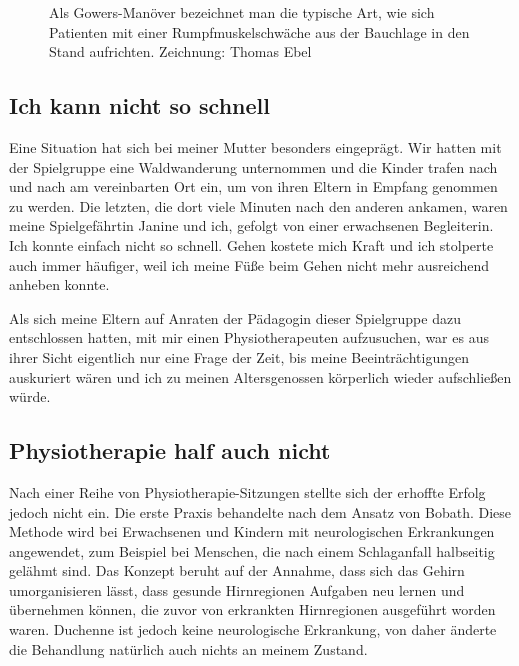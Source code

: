 \documentclass[fontsize=14pt,a4paper,headinclude,DIV=calc,automark]{scrbook}
\begin{document}
\setlength{\fboxsep}{0pt}    %
\setlength{\fboxrule}{0.2pt} %
\begin{figure}[ht]
    \centering
    \caption{Als Gowers-Manöver bezeichnet man die typische Art, wie sich Patienten mit einer Rumpfmuskelschwäche aus der Bauchlage in den Stand aufrichten. Zeichnung: Thomas Ebel}
    \label{fig:gowers-manöver}
\end{figure}

\subsection{Ich kann nicht so schnell}

Eine Situation hat sich bei meiner Mutter besonders eingeprägt. Wir hatten mit der Spielgruppe eine Waldwanderung unternommen und die Kinder trafen nach und nach am vereinbarten Ort ein, um von ihren Eltern in Empfang genommen zu werden. Die letzten, die dort viele Minuten nach den anderen ankamen, waren meine Spielgefährtin Janine und ich, gefolgt von einer erwachsenen Begleiterin. Ich konnte einfach nicht so schnell. Gehen kostete mich Kraft und ich stolperte auch immer häufiger, weil ich meine Füße beim Gehen nicht mehr ausreichend anheben konnte.

Als sich meine Eltern auf Anraten der Pädagogin dieser Spielgruppe dazu entschlossen hatten, mit mir einen Physiotherapeuten aufzusuchen, war es aus ihrer Sicht eigentlich nur eine Frage der Zeit, bis meine Beeinträchtigungen auskuriert wären und ich zu meinen Altersgenossen körperlich wieder aufschließen würde.

\subsection{Physiotherapie half auch nicht}

Nach einer Reihe von Physiotherapie-Sitzungen stellte sich der erhoffte Erfolg jedoch nicht ein. Die erste Praxis behandelte nach dem Ansatz von Bobath. Diese Methode wird bei Erwachsenen und Kindern mit neurologischen Erkrankungen angewendet, zum Beispiel bei Menschen, die nach einem Schlaganfall halbseitig gelähmt sind. Das Konzept beruht auf der Annahme, dass sich das Gehirn umorganisieren lässt, dass gesunde Hirnregionen Aufgaben neu lernen und übernehmen können, die zuvor von erkrankten Hirnregionen ausgeführt worden waren. Duchenne ist jedoch keine neurologische Erkrankung, von daher änderte die Behandlung natürlich auch nichts an meinem Zustand.
\end{document}
